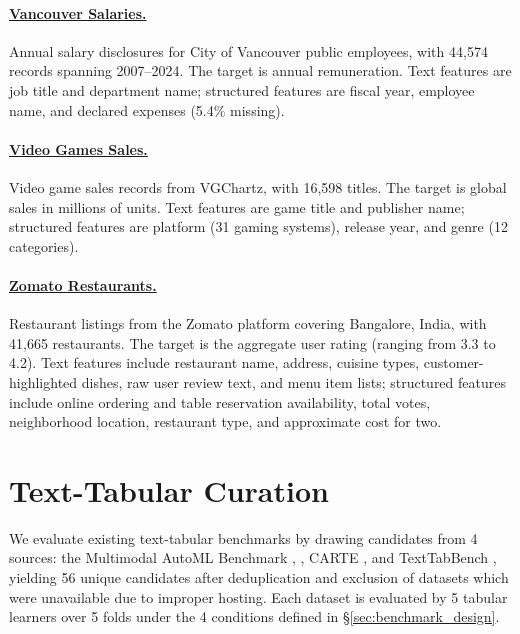 \documentclass{llmxive}
\begin{document}
\paragraph{\href{https://opendata.vancouver.ca}{Vancouver Salaries.}}
Annual salary disclosures for City of Vancouver public employees, with 44,574 records spanning 2007--2024.
The target is annual remuneration.
Text features are job title and department name; structured features are fiscal year, employee name, and declared expenses (5.4\% missing).

\paragraph{\href{https://www.kaggle.com/datasets/gregorut/videogamesales}{Video Games Sales.}}
Video game sales records from VGChartz, with 16,598 titles.
The target is global sales in millions of units.
Text features are game title and publisher name; structured features are platform (31 gaming systems), release year, and genre (12 categories).

\paragraph{\href{https://www.kaggle.com/datasets/himanshupoddar/zomato-bangalore-restaurants}{Zomato Restaurants.}}
Restaurant listings from the Zomato platform covering Bangalore, India, with 41,665 restaurants.
The target is the aggregate user rating (ranging from 3.3 to 4.2).
Text features include restaurant name, address, cuisine types, customer-highlighted dishes, raw user review text, and menu item lists; structured features include online ordering and table reservation availability, total votes, neighborhood location, restaurant type, and approximate cost for two.



\section{Text-Tabular Curation}
\label{app:text_curation}

We evaluate existing text-tabular benchmarks by drawing candidates from 4 sources: the Multimodal AutoML Benchmark \cite{shi_benchmarking_2021}, \citet{grinsztajn_vectorizing_2023}, CARTE \cite{kim_carte_2024}, and TextTabBench \cite{mraz_towards_2025}, yielding 56 unique candidates after deduplication and exclusion of datasets which were unavailable due to improper hosting. Each dataset is evaluated by 5 tabular learners over 5 folds under the 4 conditions defined in \S\ref{sec:benchmark_design}.
\end{document}
